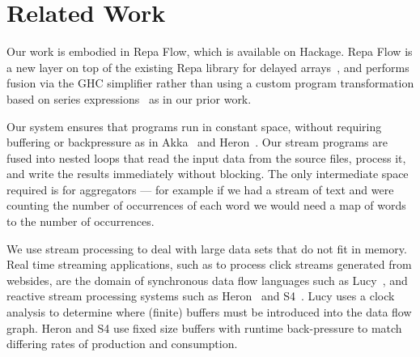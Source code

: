 \section{Related Work}




Our work is embodied in Repa Flow, which is available on Hackage. Repa Flow is a new layer on top of the existing Repa library for delayed arrays~\cite{Lippmeier:Guiding}, and performs fusion via the GHC simplifier rather than using a custom program transformation based on series expressions~\cite{Lippmeier:DataFlow} as in our prior work.

Our system ensures that programs run in constant space, without requiring buffering or backpressure as in Akka~\cite{github:akka} and Heron~\cite{Kulkarn:Heron}. Our stream programs are fused into nested loops that read the input data from the source files, process it, and write the results immediately without blocking. The only intermediate space required is for aggregators --- for example if we had a stream of text and were counting the number of occurrences of each word we would need a map of words to the number of occurrences. 

We use stream processing to deal with large data sets that do not fit in memory. Real time streaming applications, such as to process click streams generated from websides, are the domain of synchronous data flow languages such as Lucy~\cite{Mandel:Lucy}, and reactive stream processing systems such as Heron~\cite{Kulkarn:Heron} and S4~\cite{Neumeyer:S4}. Lucy uses a clock analysis to determine where (finite) buffers must be introduced into the data flow graph. Heron and S4 use fixed size buffers with runtime back-pressure to match differing rates of production and consumption.

